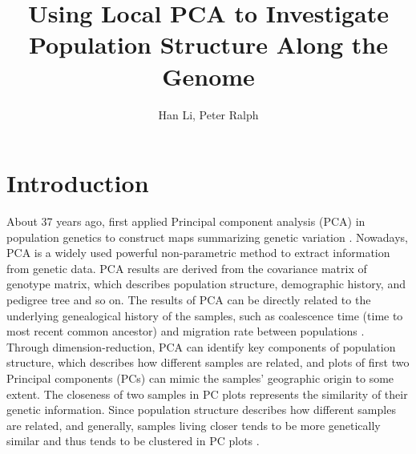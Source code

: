 \documentclass[11pt, oneside]{article}   	%
\title{Using Local PCA to Investigate Population Structure Along the Genome}
\author{Han Li, Peter Ralph}
\begin{document}
\maketitle
\doublespacing
\section{Introduction}

About 37 years ago, \citet{menozzi1978synthetic} first applied Principal component analysis (PCA) in population genetics to construct maps summarizing genetic variation \citep{menozzi1978synthetic}. Nowadays, PCA is a widely used powerful non-parametric method to extract information from genetic data. PCA results are derived from the covariance matrix of genotype matrix, which describes population structure, demographic history, and pedigree tree and so on. The results of PCA can be directly related to the underlying genealogical history of the samples, such as coalescence time (time to most recent common ancestor) and migration rate between populations \citep{menozzi1978synthetic,novembre2008interpreting,mcvean2009genealogical}. Through dimension-reduction, PCA can identify key components of population structure, which describes how different samples are related, and plots of first two Principal components (PCs) can mimic the samples' geographic origin to some extent. The closeness of two samples in PC plots represents the similarity of their genetic information. Since population structure describes how different samples are related, and generally, samples living closer tends to be more genetically similar and thus tends to be clustered in PC plots \citep{novembre2008europe,key6}.
 
\end{document}
